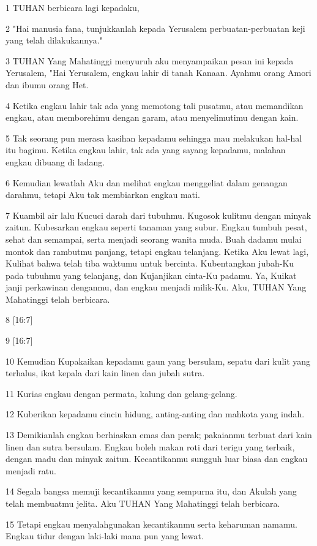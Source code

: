 \par 1 TUHAN berbicara lagi kepadaku,
\par 2 "Hai manusia fana, tunjukkanlah kepada Yerusalem perbuatan-perbuatan keji yang telah dilakukannya."
\par 3 TUHAN Yang Mahatinggi menyuruh aku menyampaikan pesan ini kepada Yerusalem, "Hai Yerusalem, engkau lahir di tanah Kanaan. Ayahmu orang Amori dan ibumu orang Het.
\par 4 Ketika engkau lahir tak ada yang memotong tali pusatmu, atau memandikan engkau, atau memborehimu dengan garam, atau menyelimutimu dengan kain.
\par 5 Tak seorang pun merasa kasihan kepadamu sehingga mau melakukan hal-hal itu bagimu. Ketika engkau lahir, tak ada yang sayang kepadamu, malahan engkau dibuang di ladang.
\par 6 Kemudian lewatlah Aku dan melihat engkau menggeliat dalam genangan darahmu, tetapi Aku tak membiarkan engkau mati.
\par 7 Kuambil air lalu Kucuci darah dari tubuhmu. Kugosok kulitmu dengan minyak zaitun. Kubesarkan engkau seperti tanaman yang subur. Engkau tumbuh pesat, sehat dan semampai, serta menjadi seorang wanita muda. Buah dadamu mulai montok dan rambutmu panjang, tetapi engkau telanjang. Ketika Aku lewat lagi, Kulihat bahwa telah tiba waktumu untuk bercinta. Kubentangkan jubah-Ku pada tubuhmu yang telanjang, dan Kujanjikan cinta-Ku padamu. Ya, Kuikat janji perkawinan denganmu, dan engkau menjadi milik-Ku. Aku, TUHAN Yang Mahatinggi telah berbicara.
\par 8 [16:7]
\par 9 [16:7]
\par 10 Kemudian Kupakaikan kepadamu gaun yang bersulam, sepatu dari kulit yang terhalus, ikat kepala dari kain linen dan jubah sutra.
\par 11 Kurias engkau dengan permata, kalung dan gelang-gelang.
\par 12 Kuberikan kepadamu cincin hidung, anting-anting dan mahkota yang indah.
\par 13 Demikianlah engkau berhiaskan emas dan perak; pakaianmu terbuat dari kain linen dan sutra bersulam. Engkau boleh makan roti dari terigu yang terbaik, dengan madu dan minyak zaitun. Kecantikanmu sungguh luar biasa dan engkau menjadi ratu.
\par 14 Segala bangsa memuji kecantikanmu yang sempurna itu, dan Akulah yang telah membuatmu jelita. Aku TUHAN Yang Mahatinggi telah berbicara.
\par 15 Tetapi engkau menyalahgunakan kecantikanmu serta keharuman namamu. Engkau tidur dengan laki-laki mana pun yang lewat.
